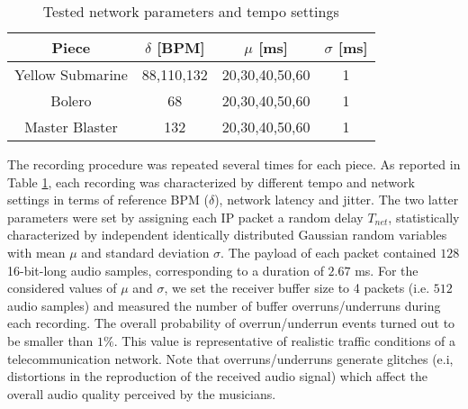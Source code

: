 \begin{table}[tb]
  \caption{Tested network parameters and tempo settings}
  \centering %
  \label{tab:NMP:param}  
  \bgroup
  \def\arraystretch{1.5}
  \begin{tabular}{||c|c|c|c||}
\hline
\hline
 Piece & $\delta$ [BPM]& $\mu$ [ms]& $\sigma$ [ms]\\
\hline
\hline
 Yellow Submarine & 88,110,132 & 20,30,40,50,60 & 1 \\
 Bolero & 68  & 20,30,40,50,60 & 1 \\
 Master Blaster & 132  & 20,30,40,50,60 & 1 \\
\hline
\hline
  \end{tabular}
  \egroup
\end{table}

The recording procedure was repeated several times for each piece. As reported in Table \ref{tab:NMP:param}, each recording was characterized by different tempo and network settings in terms of reference BPM ($\delta$), network latency and jitter. The two latter parameters were set by assigning each IP packet a random delay $T_{net}$, statistically characterized by independent identically distributed Gaussian random variables with mean $\mu$ and standard deviation $\sigma$. The payload of each packet contained $128$ 16-bit-long audio samples, corresponding to a duration of $2.67$ ms. For the considered values of $\mu$ and $\sigma$, we set the receiver buffer size to 4 packets (i.e. $512$ audio samples) and measured the number of buffer overruns/underruns during each recording. The overall probability of overrun/underrun events turned out to be smaller than $1\%$. This value is representative of realistic traffic conditions of a telecommunication network. Note that overruns/underruns generate glitches (e.i, distortions in the reproduction of the received audio signal) which affect the overall audio quality perceived by the musicians. 
 

